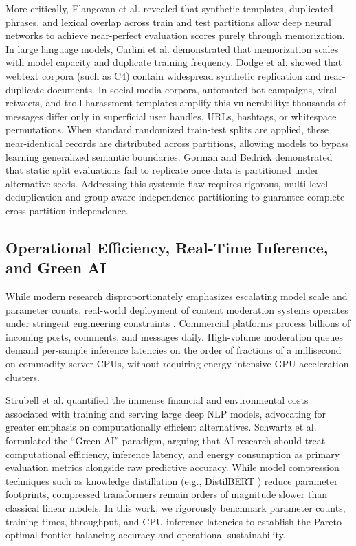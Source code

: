 \documentclass[11pt,a4paper]{article}
\begin{document}
More critically, Elangovan et al. \cite{elangovan2021memorization} revealed that synthetic templates, duplicated phrases, and lexical overlap across train and test partitions allow deep neural networks to achieve near-perfect evaluation scores purely through memorization. In large language models, Carlini et al. \cite{carlini2022quantifying} demonstrated that memorization scales with model capacity and duplicate training frequency. Dodge et al. \cite{dodge2021documenting} showed that webtext corpora (such as C4) contain widespread synthetic replication and near-duplicate documents. In social media corpora, automated bot campaigns, viral retweets, and troll harassment templates amplify this vulnerability: thousands of messages differ only in superficial user handles, URLs, hashtags, or whitespace permutations. When standard randomized train-test splits are applied, these near-identical records are distributed across partitions, allowing models to bypass learning generalized semantic boundaries. Gorman and Bedrick \cite{gorman2019we} demonstrated that static split evaluations fail to replicate once data is partitioned under alternative seeds. Addressing this systemic flaw requires rigorous, multi-level deduplication and group-aware independence partitioning to guarantee complete cross-partition independence.

\subsection{Operational Efficiency, Real-Time Inference, and Green AI}
While modern research disproportionately emphasizes escalating model scale and parameter counts, real-world deployment of content moderation systems operates under stringent engineering constraints \cite{schwartz2020green,strubell2019energy}. Commercial platforms process billions of incoming posts, comments, and messages daily. High-volume moderation queues demand per-sample inference latencies on the order of fractions of a millisecond on commodity server CPUs, without requiring energy-intensive GPU acceleration clusters.

Strubell et al. \cite{strubell2019energy} quantified the immense financial and environmental costs associated with training and serving large deep NLP models, advocating for greater emphasis on computationally efficient alternatives. Schwartz et al. \cite{schwartz2020green} formulated the ``Green AI'' paradigm, arguing that AI research should treat computational efficiency, inference latency, and energy consumption as primary evaluation metrics alongside raw predictive accuracy. While model compression techniques such as knowledge distillation (e.g., DistilBERT \cite{sanh2019distilbert}) reduce parameter footprints, compressed transformers remain orders of magnitude slower than classical linear models. In this work, we rigorously benchmark parameter counts, training times, throughput, and CPU inference latencies to establish the Pareto-optimal frontier balancing accuracy and operational sustainability.
\end{document}
